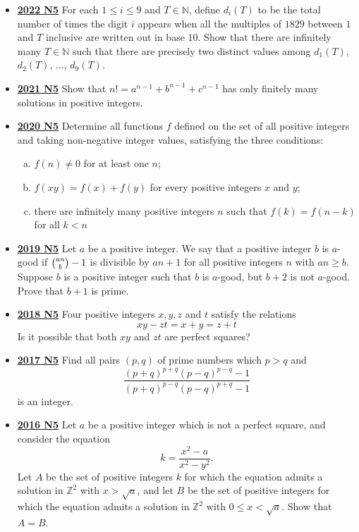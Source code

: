 \documentclass[11pt]{scrartcl}
\begin{document}
\begin{itemize}[leftmargin=*]
    \item \href{https://artofproblemsolving.com/community/c6h3107337p28104286}{\textbf{2022 N5}} For each $1\leqslant i\leqslant 9$ and $T\in\mathbb N$, define $d_i(T)$ to be the total number of times the digit $i$ appears when all the multiples of $1829$ between $1$ and $T$ inclusive are written out in base $10$. Show that there are infinitely many $T\in\mathbb N$ such that there are precisely two distinct values among $d_1(T)$, $d_2(T)$, $\dots$, $d_9(T)$.
\item \href{https://artofproblemsolving.com/community/c6h2882536p25627492}{\textbf{2021 N5}} Show that $n!=a^{n-1}+b^{n-1}+c^{n-1}$ has only finitely many solutions in positive integers.
\item \href{https://artofproblemsolving.com/community/c6h2625925p22698553}{\textbf{2020 N5}} Determine all functions $f$ defined on the set of all positive integers and taking non-negative integer values, satisfying the three conditions:
\begin{enumerate}[(a)]
\item $f(n) \neq 0$ for at least one $n$;
\item $f(x y)=f(x)+f(y)$ for every positive integers $x$ and $y$;
\item there are infinitely many positive integers $n$ such that $f(k)=f(n-k)$ for all $k<n$
\end{enumerate}
\item \href{https://artofproblemsolving.com/community/c6h2279015p17828930}{\textbf{2019 N5}} 	Let $a$ be a positive integer. We say that a positive integer $b$ is $a$-good if $\tbinom{an}{b}-1$ is divisible by $an+1$ for all positive integers $n$ with $an \geqslant  b$. Suppose $b$ is a positive integer such that $b$ is $a$-good, but $b+2$ is not $a$-good. Prove that $b+1$ is prime.
\item \href{https://artofproblemsolving.com/community/c6h1876761p12752815}{\textbf{2018 N5}} Four positive integers $x,y,z$ and $t$ satisfy the relations
\[ xy - zt = x + y = z + t\]Is it possible that both $xy$ and $zt$ are perfect squares?
\item \href{https://artofproblemsolving.com/community/c6h1671301p10632380}{\textbf{2017 N5}} Find all pairs $(p,q)$ of prime numbers which $p>q$ and
$$\frac{(p+q)^{p+q}(p-q)^{p-q}-1}{(p+q)^{p-q}(p-q)^{p+q}-1}$$is an integer.
\newpage
\item \href{https://artofproblemsolving.com/community/c6h1480706p8639282}{\textbf{2016 N5}} Let $a$ be a positive integer which is not a perfect square, and consider the equation\[k = \frac{x^2-a}{x^2-y^2}.\]Let $A$ be the set of positive integers $k$ for which the equation admits a solution in $\mathbb Z^2$ with $x>\sqrt{a}$, and let $B$ be the set of positive integers for which the equation admits a solution in $\mathbb Z^2$ with $0\leqslant x<\sqrt{a}$. Show that $A=B$.

\end{itemize}
\end{document}
